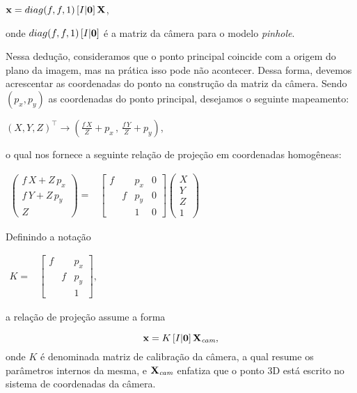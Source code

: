 \begin{center}
$\mathbf{x} = diag(f,f,1)\,[I|{\bf 0}]\,\mathbf{X}$,
\end{center}
onde $diag(f,f,1)\,[I|{\bf 0}]$ é a matriz da câmera para o modelo \textit{pinhole}.

Nessa dedução, consideramos que o ponto principal  coincide com a origem do plano da imagem, mas na prática isso pode não acontecer. Dessa forma, devemos acrescentar as coordenadas do ponto na construção da matriz da câmera. Sendo $(p_x,p_y)$ as coordenadas do ponto principal, desejamos o seguinte mapeamento:

\begin{center}
$(X,Y,Z)^\top \rightarrow (\frac{f\,X}{Z}+p_x\,,\,\frac{f\,Y}{Z}+p_y)$,
\end{center}
o qual nos fornece a seguinte relação de projeção em coordenadas homogêneas:

\begin{center}
$
\begin{array}{ccc}
\begin{pmatrix}
f\,X + Z\,p_x\\
f\,Y + Z\,p_y\\
Z
\end{pmatrix}=
&
\begin{bmatrix}
f& &p_x&0\\
 &f&p_y&0\\
 & &1&0
\end{bmatrix}
\begin{pmatrix}
X\\
Y\\
Z\\
1
\end{pmatrix}
\end{array}
$
\end{center}

Definindo a notação

\begin{center}
$
\begin{array}{cc}
K = & \begin{bmatrix}
      f& &p_x\\
       &f&p_y\\
       & &1
      \end{bmatrix}, 
\end{array}
$
\end{center}
a relação de projeção assume a forma


\begin{equation}
\mathbf{x}=K\,[I|{\bf 0}]\,\mathbf{X}_{\textit{cam}},
\end{equation}
onde $K$ é denominada matriz de calibração da câmera, a qual resume os parâmetros internos da mesma, e $\mathbf{X}_{\textit{cam}}$ enfatiza que o ponto 3D está escrito no sistema de coordenadas da câmera.

